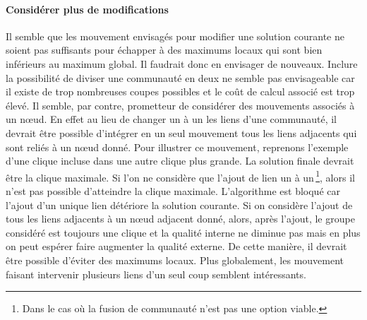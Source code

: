 \paragraph{Considérer plus de modifications}
Il semble que les mouvement envisagés pour modifier une solution courante ne soient pas suffisants pour échapper à des maximums locaux qui sont bien inférieurs au maximum global.
Il faudrait donc en envisager de nouveaux.
Inclure la possibilité de diviser une communauté en deux ne semble pas envisageable car il existe de trop nombreuses coupes possibles et le coût de calcul associé est trop élevé.
Il semble, par contre, prometteur de considérer des mouvements associés à un n\oe{}ud.
En effet au lieu de changer un à un les liens d'une communauté, il devrait être possible d'intégrer en un seul mouvement tous les liens adjacents qui sont reliés à un n\oe{}ud donné.
Pour illustrer ce mouvement, reprenons l'exemple d'une clique incluse dans une autre clique plus grande.
La solution finale devrait être la clique maximale.
Si l'on ne considère que l'ajout de lien un à un\,\footnote{Dans le cas où la fusion de communauté n'est pas une option viable.}, alors il n'est pas possible d'atteindre la clique maximale.
L'algorithme est bloqué car l'ajout d'un unique lien détériore la solution courante.
Si on considère l'ajout de tous les liens adjacents à un n\oe{}ud adjacent donné, alors, après l'ajout, le groupe considéré est toujours une clique et la qualité interne ne diminue pas mais en plus on peut espérer faire augmenter la qualité externe.
De cette manière, il devrait être possible d'éviter des maximums locaux.
Plus globalement, les mouvement faisant intervenir plusieurs liens d'un seul coup semblent intéressants.



